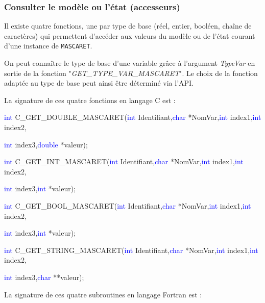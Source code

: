 \documentclass[a4paper,11pt]{article}
\begin{document}
\subsubsection{Consulter le mod\`ele ou l'\'etat (accesseurs)}

 Il existe quatre fonctions, une par type de base (r\'eel, entier, bool\'een, cha\^ine de caract\`eres) qui permettent d'acc\'eder aux valeurs du mod\`ele ou de l'\'etat courant d'une instance de \texttt{MASCARET}.
 
 \vspace{0.5cm}
 
 On peut conna\^itre le type de base d'une variable gr\^ace \`a l'argument \textit{TypeVar} en sortie de la fonction "\textit{GET\_TYPE\_VAR\_MASCARET}". Le choix de la fonction adapt\'ee au type de base peut ainsi \^etre d\'etermin\'e via l'API.
 
 \vspace{0.5cm}
 
 La signature de ces quatre fonctions en langage C est :
 
  \vspace{0.5cm}
 
 \textcolor{blue}{int} C\_GET\_DOUBLE\_MASCARET(\textcolor{blue}{int} Identifiant,\textcolor{blue}{char} *NomVar,\textcolor{blue}{int} index1,\textcolor{blue}{int} index2,
 
 \textcolor{blue}{int} index3,\textcolor{blue}{double} *valeur);
 
 \textcolor{blue}{int} C\_GET\_INT\_MASCARET(\textcolor{blue}{int} Identifiant,\textcolor{blue}{char} *NomVar,\textcolor{blue}{int} index1,\textcolor{blue}{int} index2,
 
 \textcolor{blue}{int} index3,\textcolor{blue}{int} *valeur);
 
 \textcolor{blue}{int} C\_GET\_BOOL\_MASCARET(\textcolor{blue}{int} Identifiant,\textcolor{blue}{char} *NomVar,\textcolor{blue}{int} index1,\textcolor{blue}{int} index2,
 
 \textcolor{blue}{int} index3,\textcolor{blue}{int} *valeur);
 
 \textcolor{blue}{int} C\_GET\_STRING\_MASCARET(\textcolor{blue}{int} Identifiant,\textcolor{blue}{char} *NomVar,\textcolor{blue}{int} index1,\textcolor{blue}{int} index2,
 
 \textcolor{blue}{int} index3,\textcolor{blue}{char} **valeur);
 
 \vspace{0.5cm} 
 
 La signature de ces quatre subroutines en langage Fortran est :
 
\end{document}
